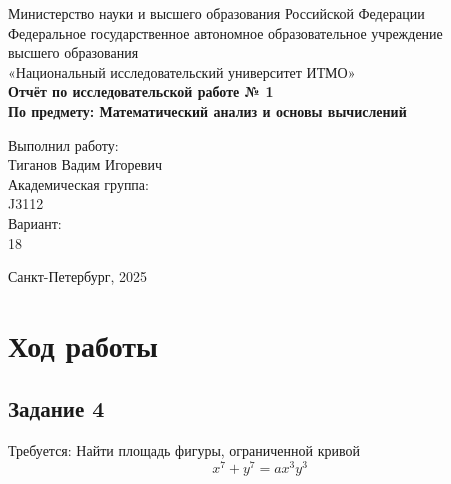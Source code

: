 \documentclass[a4paper,12pt]{article}
\begin{document}
\thispagestyle{empty}
\begin{center}
    \large
    Министерство науки и высшего образования Российской Федерации\\
    Федеральное государственное автономное образовательное учреждение\\
    высшего образования\\
    «Национальный исследовательский университет ИТМО»\\
    \vspace{5cm}
    \textbf{Отчёт по исследовательской работе № 1}\\
    \textbf{По предмету: Математический анализ и основы вычислений}\\
    \vspace{6cm}
    \begin{flushright}
        Выполнил работу:\\ Тиганов Вадим Игоревич\\
        \vspace{1cm}
        Академическая группа: \\ J3112\\
        \vspace{1cm}
        Вариант: \\18
    \end{flushright}
    \vspace{1cm}
    \vspace{3cm}
    \begin{center}
        Санкт-Петербург, 2025\\
    \end{center}
\end{center}

\newpage


\section{Ход работы}


\subsection{Задание 4}

Требуется:
Найти площадь фигуры, ограниченной кривой \[x^7 + y^7 = ax^3y^3\]
\end{document}
